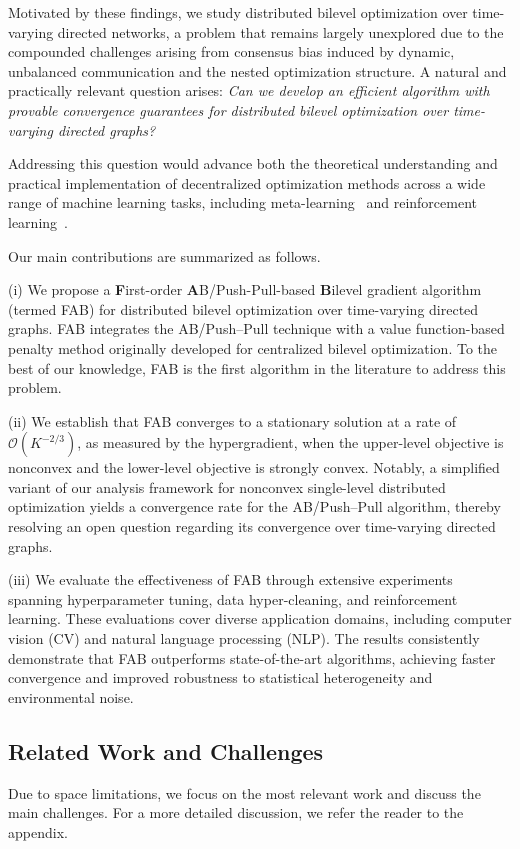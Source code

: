 \documentclass{article}
\theoremstyle{plain}
\theoremstyle{definition}
\theoremstyle{remark}
\begin{document}
Motivated by these findings, we study distributed bilevel optimization over time-varying directed networks, a problem that remains largely unexplored due to the compounded challenges arising from consensus bias induced by dynamic, unbalanced communication and the nested optimization structure. 
A natural and practically relevant question arises:
\textit{Can we develop an efficient algorithm with provable convergence guarantees for distributed bilevel optimization over time-varying directed graphs?} 

Addressing this question would advance both the theoretical understanding and practical implementation of decentralized optimization methods across a wide range of machine learning tasks, including meta-learning~\cite{Finn2017,li2025tmetanet} and reinforcement learning~\cite{dasMARL2019,HanRL2025}.

Our main contributions are summarized as follows. 

(i)  We propose a \textbf{F}irst-order \textbf{A}B/Push-Pull-based \textbf{B}ilevel gradient algorithm (termed FAB) for distributed bilevel optimization over time-varying directed graphs. FAB integrates the AB/Push–Pull technique with a value function-based penalty method originally developed for centralized bilevel optimization. To the best of our knowledge, FAB is the first algorithm in the literature to address this problem. 

(ii) We establish that FAB converges to a stationary solution at a rate of $\mathcal{O}(K^{-2/3})$, as measured by the hypergradient, when the upper-level objective is nonconvex and the lower-level objective is strongly convex. Notably, a simplified variant of our analysis framework for nonconvex single-level distributed optimization yields a convergence rate for the AB/Push–Pull algorithm, thereby resolving an open question regarding its convergence over time-varying directed graphs.

(iii) We evaluate the effectiveness of FAB through extensive experiments spanning hyperparameter tuning, data hyper-cleaning, and reinforcement learning. These evaluations cover diverse application domains, including computer vision (CV) and natural language processing (NLP). The results consistently demonstrate that FAB outperforms state-of-the-art algorithms, achieving faster convergence and improved robustness to statistical heterogeneity and environmental noise.



\subsection{Related Work and Challenges}
Due to space limitations, we focus on the most relevant work and discuss the main challenges. For a more detailed discussion, we refer the reader to the appendix. 
\end{document}
